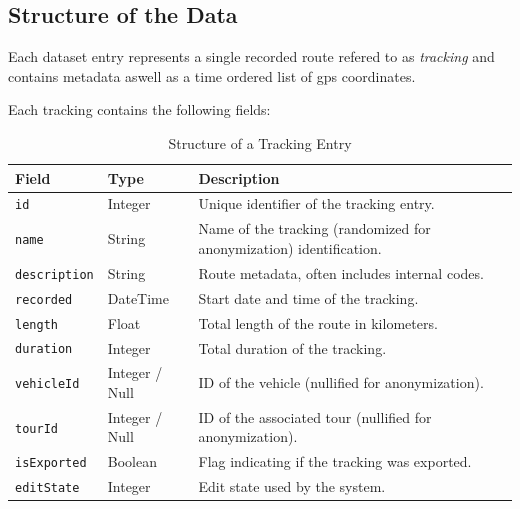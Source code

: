 \documentclass[a4paper,12pt,twoside]{scrreprt}
\begin{document}
\subsection{Structure of the Data}
Each dataset entry represents a single recorded route refered to as
\textit{tracking} and contains metadata aswell as a time ordered list of gps
coordinates.

Each tracking contains the following fields:
\begin{table}[H]
  \centering
  \caption{Structure of a Tracking Entry}
  \label{tab:tracking_structure}
  \begin{tabular}{|l|l|p{8cm}|}
    \hline
    \textbf{Field}       & \textbf{Type}  & \textbf{Description}
    \\
    \hline
    \texttt{id}          & Integer        & Unique identifier of the tracking
    entry.

    \\
    \hline
    \texttt{name}        & String         & Name of the tracking (randomized
    for anonymization)
    identification.
    \\
    \hline
    \texttt{description} & String         & Route metadata, often includes
    internal codes.
    \\
    \hline
    \texttt{recorded}    & DateTime       & Start date and time of the
    tracking.
    \\
    \hline
    \texttt{length}      & Float          & Total length of the route in
    kilometers.
    \\
    \hline
    \texttt{duration}    & Integer        & Total duration of the tracking.
    \\
    \hline
    \texttt{vehicleId}   & Integer / Null & ID of the vehicle (nullified for
    anonymization).
    \\
    \hline
    \texttt{tourId}      & Integer / Null & ID of the associated tour
    (nullified for anonymization).
    \\
    \hline
    \texttt{isExported}  & Boolean        & Flag indicating if the tracking was
    exported.
    \\
    \hline
    \texttt{editState}   & Integer        & Edit state used by the system.
    \\
    \hline
  \end{tabular}
\end{table}
\end{document}

